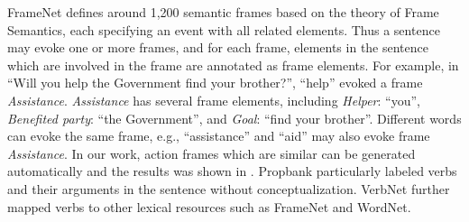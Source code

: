 FrameNet defines around 1,200 semantic frames based on
the theory of Frame Semantics, each specifying an event
with all related elements. Thus a sentence may evoke
one or more frames, and for each frame, elements in the sentence
which are involved in the frame are annotated as frame elements.
For example, in ``Will you help the Government find your brother?'',
``help'' evoked a frame {\em Assistance}.
{\em Assistance} has several frame elements,
including {\em Helper}: ``you'', {\em Benefited party}:
``the Government'', and {\em Goal}: ``find your brother''.
Different words can evoke the same frame, e.g., ``assistance''
and ``aid'' may also evoke frame {\em Assistance}.
In our work, action frames which are similar can be generated
automatically and the results was shown in .
Propbank particularly labeled verbs and their arguments
in the sentence without conceptualization.
VerbNet\cite{KipperDP00} further mapped verbs
to other lexical resources such as FrameNet and WordNet\cite{wordnet}.

